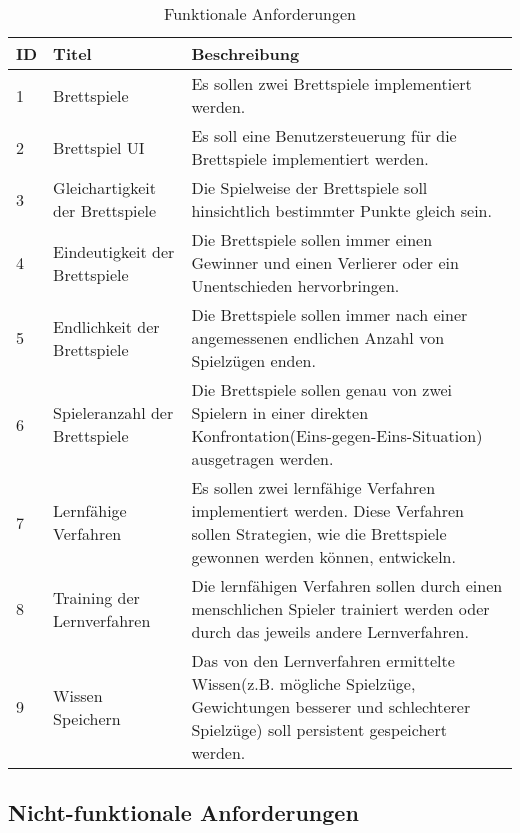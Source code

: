 \begin{table}
\caption{Funktionale Anforderungen}
\begin{tabular}{ | p{} | p{} | p{} |}
\hline
\ac{ID} & Titel & Beschreibung \\ \hline
1 & Brettspiele & Es sollen zwei Brettspiele implementiert werden. \\ \hline
2 & Brettspiel \ac{UI} &  Es soll eine Benutzersteuerung für die Brettspiele implementiert werden. \\ \hline
3 & Gleichartigkeit der Brettspiele & Die Spielweise der Brettspiele soll hinsichtlich bestimmter Punkte gleich sein. \\ \hline
4 & Eindeutigkeit der Brettspiele & Die Brettspiele sollen immer einen Gewinner und einen Verlierer oder ein Unentschieden hervorbringen. \\ \hline
5 & Endlichkeit der Brettspiele & Die Brettspiele sollen immer nach einer angemessenen endlichen Anzahl von Spielzügen enden. \\ \hline
6 & Spieleranzahl der Brettspiele & Die Brettspiele sollen genau von zwei Spielern in einer direkten Konfrontation(Eins-gegen-Eins-Situation) ausgetragen werden. \\ \hline
7 & Lernfähige Verfahren & Es sollen zwei lernfähige Verfahren implementiert werden. Diese Verfahren sollen Strategien, wie die Brettspiele gewonnen werden können, entwickeln. \\ \hline
8 & Training der Lernverfahren & Die lernfähigen Verfahren sollen durch einen menschlichen Spieler trainiert werden oder durch das jeweils andere Lernverfahren. \\ \hline
9 & Wissen Speichern & Das von den Lernverfahren ermittelte Wissen(z.B. mögliche Spielzüge, Gewichtungen besserer und schlechterer Spielzüge) soll persistent gespeichert werden. \\ \hline
\end{tabular}
\label{tab:funktionale_anforderungen}
\end{table}

\subsection{Nicht-funktionale Anforderungen}


